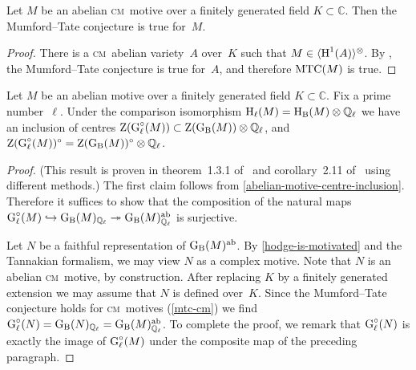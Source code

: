 \documentclass[10pt,twoside,leqno]{article}
\numberwithin{equation}{subsection}
\newcommand{\into}{\hookrightarrow}
\newcommand{\onto}{\twoheadrightarrow}
\newcommand{\QQ}{\mathbb{Q}}
\newcommand{\QQl}{\QQ_{\ell}}
\newcommand{\CC}{\mathbb{C}}
\newcommand{\ab}{\textnormal{ab}}
\newcommand{\HH}{\textnormal{H}}
\newcommand{\Hl}{\HH_{\ell}}
\newcommand{\HB}{\HH_{\textnormal{B}}}
\newcommand{\Zentrum}{\textnormal{Z}}
\newcommand{\GG}{\textnormal{G}}
\newcommand{\GB}{\GG_{\textnormal{B}}}
\newcommand{\Gl}{\GG_{\ell}}
\newcommand{\Glc}{\Gl^{\circ}}
\newcommand{\Tangen}[1]{\langle #1 \rangle^{\otimes}}
\newcommand{\cm}{\textsc{cm}}
\newcommand{\MTC}{\textnormal{MTC}}
\begin{document}
\begin{lemma} %
 \label{mtc-cm}
 Let $M$ be an abelian \cm~motive
 over a finitely generated field $K \subset \CC$.
 Then the Mumford--Tate conjecture is true for~$M$.
 \begin{proof}
  There is a \cm~abelian variety~$A$ over~$K$
  such that $M \in \Tangen{\HH^1(A)}$.
  By \cite{Pohl68}, the Mumford--Tate conjecture is true for~$A$,
  and therefore $\MTC(M)$ is true.
 \end{proof}
\end{lemma}

\begin{lemma} %
 \label{centre-mtc-abelian-motive}
 Let $M$ be an abelian motive over
 a finitely generated field $K \subset \CC$.
 Fix a prime number~$\ell$.
 Under the comparison isomorphism $\Hl(M) = \HB(M) \otimes \QQl$
 we have an inclusion of centres
 $\Zentrum(\Glc(M)) \subset \Zentrum(\GB(M)) \otimes \QQl$, and
 $\Zentrum(\Glc(M))^\circ = \Zentrum(\GB(M))^\circ \otimes \QQl$.
 \begin{proof}
  (This result is proven in theorem~1.3.1 of~\cite{Va08}
  and corollary~2.11 of~\cite{UY13} using different methods.)
  The first claim follows from \cref{abelian-motive-centre-inclusion}.
  Therefore it suffices to show that the composition
  of the natural maps
  $\Glc(M) \into \GB(M)_{\QQl} \onto \GB(M)^\ab_{\QQl}$
  is surjective.

  Let $N$ be a faithful representation of $\GB(M)^\ab$.
  By \cref{hodge-is-motivated} and the Tannakian formalism,
  we may view $N$ as a complex motive.
  Note that $N$ is an abelian \cm~motive, by construction.
  After replacing $K$ by a finitely generated extension
  we may assume that $N$ is defined over~$K$.
  Since the Mumford--Tate conjecture holds for \cm~motives (\cref{mtc-cm})
  we find $\Glc(N) = \GB(N)_{\QQl} = \GB(M)^\ab_{\QQl}$.
  To complete the proof,
  we remark that $\Glc(N)$ is exactly the image of $\Glc(M)$
  under the composite map of the preceding paragraph.
 \end{proof}
\end{lemma}
\end{document}
